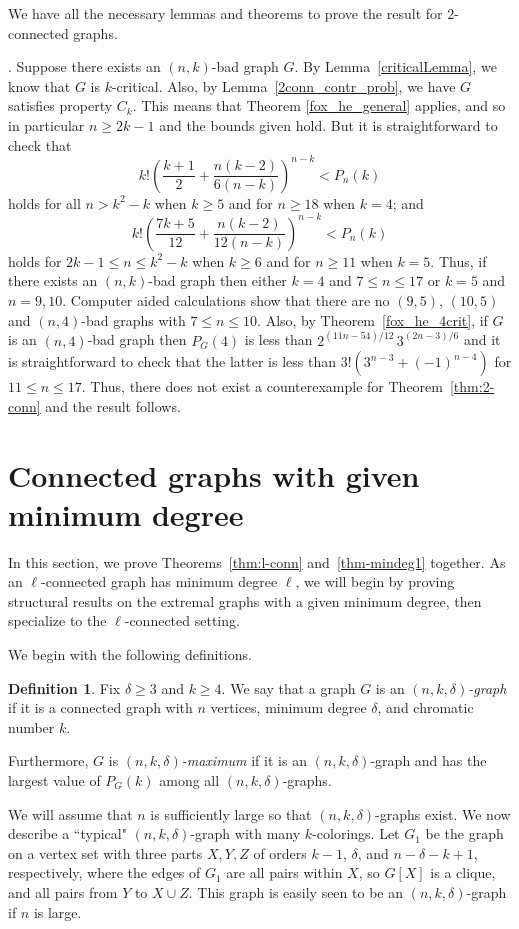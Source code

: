 \documentclass[11pt]{article}
\theoremstyle{plain}
\theoremstyle{definition}
\newtheorem{definition}[theorem]{Definition}
\theoremstyle{remark}
\begin{document}
We have all the necessary lemmas and theorems to prove the result for $2$-connected graphs.

\medskip

. Suppose there exists an $(n,k)$-bad graph $G$. By Lemma~\ref{criticalLemma}, we know that $G$ is $k$-critical. Also, by Lemma~\ref{2conn_contr_prob}, we have $G$ satisfies property $C_k$. This means that Theorem \ref{fox_he_general} applies, and so in particular $n\geq 2k-1$ and the bounds given hold.  But it is straightforward to check that
$$ k!\left(\frac{k+1}{2}+\frac{n(k-2)}{6(n-k)}\right)^{n-k}<P_n(k)$$ holds for all $n>k^2-k$ when $k\geq 5$ and for $n\geq 18$ when $k=4$; and $$k!\left(\frac{7k+5}{12}+\frac{n(k-2)}{12(n-k)}\right)^{n-k}<P_n(k)$$ holds for $2k-1\leq n\leq k^2-k$ when $k\geq 6$ and for $n\geq 11$ when $k=5$. Thus, if there exists an $(n,k)$-bad graph then either $k=4$ and $7\leq n\leq 17$ or $k=5$ and $n=9,10$. Computer aided calculations show that there are no $(9,5)$, $(10,5)$ and $(n,4)$-bad graphs with $7\leq n\leq 10$. Also, by Theorem~\ref{fox_he_4crit}, if $G$ is an $(n,4)$-bad graph then $P_G(4)$ is less than $2^{(11n-54)/12}\,3^{(2n-3)/6}$ and it is straightforward to check  that the latter is less than $3!(3^{n-3}+(-1)^{n-4})$ for $11\leq n\leq 17$. Thus, there does not exist a counterexample for Theorem~\ref{thm:2-conn} and the result follows.

\section{Connected graphs with given minimum degree} \label{sec:min-deg}
In this section, we prove Theorems~\ref{thm:l-conn} and~\ref{thm-mindeg1} together. As an $\ell$-connected graph has minimum degree $\ell$, we will begin by proving structural results on the extremal graphs with a given minimum degree, then specialize to the $\ell$-connected setting.

We begin with the following definitions.
\begin{definition}
Fix $\delta\geq 3$ and $k\geq 4$. We say that a graph $G$ is an {\em $(n,k,\delta)$-graph} if it is a connected graph with $n$ vertices, minimum degree $\delta$, and chromatic number $k$.

Furthermore, $G$ is {\em $(n,k,\delta)$-maximum} if it is an $(n,k,\delta)$-graph and has the largest value of $P_G(k)$ among all $(n,k,\delta)$-graphs. 
\end{definition}
We will assume that $n$ is sufficiently large so that $(n,k,\delta)$-graphs exist. We now describe a ``typical" $(n,k,\delta)$-graph with many $k$-colorings. Let $G_1$ be the graph on a vertex set with three parts $X, Y, Z$ of orders $k-1$, $\delta$, and $n-\delta-k+1$, respectively, where the edges of $G_1$ are all pairs within $X$, so $G[X]$ is a clique, and all pairs from $Y$ to $X\cup Z$. This graph is easily seen to be an $(n,k,\delta)$-graph if $n$ is large.
\end{document}
